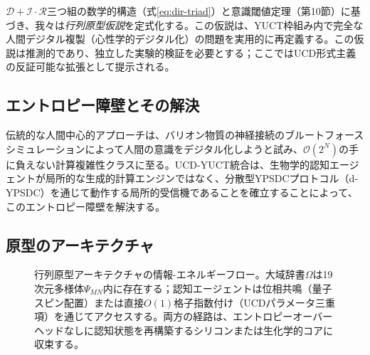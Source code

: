 \documentclass[11pt,a4paper]{article}
\begin{document}
	\(\mathcal{D}+\mathcal{I}\cdot\mathcal{R}\)三つ組の数学的構造（式\ref{eq:dir-triad}）と意識閾値定理（第10節）に基づき、我々は\textit{行列原型仮説}を定式化する。この仮説は、YUCT枠組み内で完全な人間デジタル複製（心性学的デジタル化）の問題を実用的に再定義する。この仮説は推測的であり、独立した実験的検証を必要とする；ここではUCD形式主義の反証可能な拡張として提示される。
	
	\subsection{エントロピー障壁とその解決}
	
	伝統的な人間中心的アプローチは、バリオン物質の神経接続のブルートフォースシミュレーションによって人間の意識をデジタル化しようと試み、\(\mathcal{O}(2^N)\)の手に負えない計算複雑性クラスに至る。UCD-YUCT統合は、生物学的認知エージェントが局所的な生成的計算エンジンではなく、分散型YPSDCプロトコル（d-YPSDC）を通じて動作する局所的受信機であることを確立することによって、このエントロピー障壁を解決する。
	
	\subsection{原型のアーキテクチャ}
	
	\begin{figure}[h!]
		\centering
		\caption{行列原型アーキテクチャの情報-エネルギーフロー。大域辞書\(\Omega\)は19次元多様体\(\Psi_{MN}\)内に存在する；認知エージェントは位相共鳴（量子スピン配置）または直接\(O(1)\)格子指数付け（UCDパラメータ三重項）を通じてアクセスする。両方の経路は、エントロピーオーバーヘッドなしに認知状態を再構築するシリコンまたは生化学的コアに収束する。}
		\label{fig:matrix_flow}
	\end{figure}
	
\end{document}
